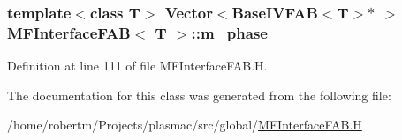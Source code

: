 \subsubsection[{\texorpdfstring{m\+\_\+phase}{m_phase}}]{\setlength{\rightskip}{0pt plus 5cm}template$<$class T$>$ Vector$<$Base\+I\+V\+F\+AB$<$T$>$$\ast$ $>$ {\bf M\+F\+Interface\+F\+AB}$<$ T $>$\+::m\+\_\+phase\hspace{0.3cm}{\ttfamily [protected]}}\hypertarget{classMFInterfaceFAB_a1db6bd48d72b77110541b3193c3741fa}{}\label{classMFInterfaceFAB_a1db6bd48d72b77110541b3193c3741fa}


Definition at line 111 of file M\+F\+Interface\+F\+A\+B.\+H.



The documentation for this class was generated from the following file\+:\begin{DoxyCompactItemize}
\item 
/home/robertm/\+Projects/plasmac/src/global/\hyperlink{MFInterfaceFAB_8H}{M\+F\+Interface\+F\+A\+B.\+H}\end{DoxyCompactItemize}
